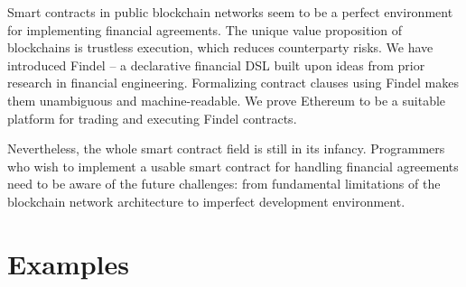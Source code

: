 Smart contracts in public blockchain networks seem to be a perfect environment for implementing financial agreements.
The unique value proposition of blockchains is trustless execution, which reduces counterparty risks.
We have introduced Findel -- a declarative financial DSL built upon ideas from prior research in financial engineering.
Formalizing contract clauses using Findel makes them unambiguous and machine-readable.
We prove Ethereum to be a suitable platform for trading and executing Findel contracts.

Nevertheless, the whole smart contract field is still in its infancy.
Programmers who wish to implement a usable smart contract for handling financial agreements need to be aware of the future challenges: from fundamental limitations of the blockchain network architecture to imperfect development environment.

\pagebreak

\section{Examples} \label{sec:Ch10FindelExamples}

